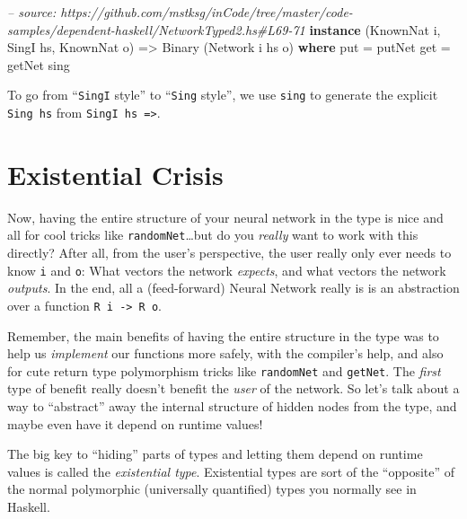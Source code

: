 \documentclass[]{article}
\newenvironment{Shaded}{}{}
\newcommand{\KeywordTok}[1]{\textcolor[rgb]{0.00,0.44,0.13}{\textbf{{#1}}}}
\newcommand{\DataTypeTok}[1]{\textcolor[rgb]{0.56,0.13,0.00}{{#1}}}
\newcommand{\CommentTok}[1]{\textcolor[rgb]{0.38,0.63,0.69}{\textit{{#1}}}}
\newcommand{\OtherTok}[1]{\textcolor[rgb]{0.00,0.44,0.13}{{#1}}}
\newcommand{\FunctionTok}[1]{\textcolor[rgb]{0.02,0.16,0.49}{{#1}}}
\newcommand{\NormalTok}[1]{{#1}}
\begin{document}
\begin{Shaded}
\begin{Highlighting}[]
\CommentTok{-- source: https://github.com/mstksg/inCode/tree/master/code-samples/dependent-haskell/NetworkTyped2.hs#L69-71}
\KeywordTok{instance} \NormalTok{(}\DataTypeTok{KnownNat} \NormalTok{i, }\DataTypeTok{SingI} \NormalTok{hs, }\DataTypeTok{KnownNat} \NormalTok{o) }\OtherTok{=>} \DataTypeTok{Binary} \NormalTok{(}\DataTypeTok{Network} \NormalTok{i hs o) }\KeywordTok{where}
    \NormalTok{put }\FunctionTok{=} \NormalTok{putNet}
    \NormalTok{get }\FunctionTok{=} \NormalTok{getNet sing}
\end{Highlighting}
\end{Shaded}

To go from ``\texttt{SingI} style'' to ``\texttt{Sing} style'', we use
\texttt{sing} to generate the explicit \texttt{Sing\ hs} from
\texttt{SingI\ hs\ =\textgreater{}}.

\section{Existential Crisis}\label{existential-crisis}

Now, having the entire structure of your neural network in the type is nice and
all for cool tricks like \texttt{randomNet}\ldots{}but do you \emph{really} want
to work with this directly? After all, from the user's perspective, the user
really only ever needs to know \texttt{i} and \texttt{o}: What vectors the
network \emph{expects}, and what vectors the network \emph{outputs}. In the end,
all a (feed-forward) Neural Network really is is an abstraction over a function
\texttt{R\ i\ -\textgreater{}\ R\ o}.

Remember, the main benefits of having the entire structure in the type was to
help us \emph{implement} our functions more safely, with the compiler's help,
and also for cute return type polymorphism tricks like \texttt{randomNet} and
\texttt{getNet}. The \emph{first} type of benefit really doesn't benefit the
\emph{user} of the network. So let's talk about a way to ``abstract'' away the
internal structure of hidden nodes from the type, and maybe even have it depend
on runtime values!

The big key to ``hiding'' parts of types and letting them depend on runtime
values is called the \emph{existential type}. Existential types are sort of the
``opposite'' of the normal polymorphic (universally quantified) types you
normally see in Haskell.
\end{document}
